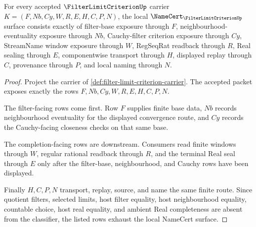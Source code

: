 \begin{theorem}\label{thm:filter-limit-criterion-namecert-obligations}
For every accepted $\FilterLimitCriterionUp$ carrier $K=(F,Nb,Cy,W,R,E,H,C,P,N)$, the local $\NameCert_{\FilterLimitCriterionUp}$ surface consists exactly of filter-base exposure through $F$, neighbourhood-eventuality exposure through $Nb$, Cauchy-filter criterion exposure through $Cy$, StreamName window exposure through $W$, RegSeqRat readback through $R$, Real sealing through $E$, componentwise transport through $H$, displayed replay through $C$, provenance through $P$, and local naming through $N$.
\end{theorem}
\begin{proof}
Project the carrier of \autoref{def:filter-limit-criterion-carrier}. The accepted packet exposes exactly the rows $F,Nb,Cy,W,R,E,H,C,P,N$.

The filter-facing rows come first. Row $F$ supplies finite base data, $Nb$ records neighbourhood eventuality for the displayed convergence route, and $Cy$ records the Cauchy-facing closeness checks on that same base.

The completion-facing rows are downstream. Consumers read finite windows through $W$, regular rational readback through $R$, and the terminal Real seal through $E$ only after the filter-base, neighbourhood, and Cauchy rows have been displayed.

Finally $H,C,P,N$ transport, replay, source, and name the same finite route. Since quotient filters, selected limits, host filter equality, host neighbourhood equality, countable choice, host real equality, and ambient Real completeness are absent from the classifier, the listed rows exhaust the local NameCert surface.
\end{proof}

